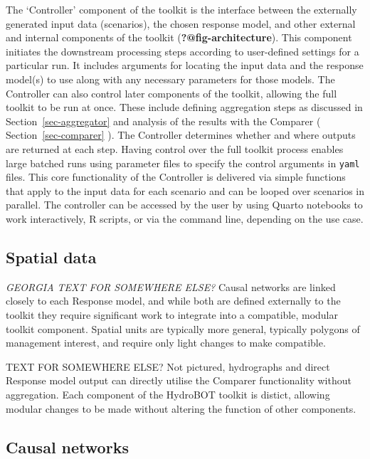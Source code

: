 \documentclass[
  number]{elsarticle}
\begin{document}
The `Controller' component of the toolkit is the interface between the
externally generated input data (scenarios), the chosen response model,
and other external and internal components of the toolkit
(\textbf{?@fig-architecture}). This component initiates the downstream
processing steps according to user-defined settings for a particular
run. It includes arguments for locating the input data and the response
model(s) to use along with any necessary parameters for those models.
The Controller can also control later components of the toolkit,
allowing the full toolkit to be run at once. These include defining
aggregation steps as discussed in Section~\ref{sec-aggregator} and
analysis of the results with the Comparer ( Section~\ref{sec-comparer}
). The Controller determines whether and where outputs are returned at
each step. Having control over the full toolkit process enables large
batched runs using parameter files to specify the control arguments in
\texttt{yaml} files. This core functionality of the Controller is
delivered via simple functions that apply to the input data for each
scenario and can be looped over scenarios in parallel. The controller
can be accessed by the user by using Quarto notebooks to work
interactively, R scripts, or via the command line, depending on the use
case.

\hypertarget{sec-spatial_data}{%
\subsection{Spatial data}\label{sec-spatial_data}}

\emph{GEORGIA TEXT FOR SOMEWHERE ELSE?} Causal networks are linked
closely to each Response model, and while both are defined externally to
the toolkit they require significant work to integrate into a
compatible, modular toolkit component. Spatial units are typically more
general, typically polygons of management interest, and require only
light changes to make compatible.

TEXT FOR SOMEWHERE ELSE? Not pictured, hydrographs and direct Response
model output can directly utilise the Comparer functionality without
aggregation. Each component of the HydroBOT toolkit is distict, allowing
modular changes to be made without altering the function of other
components.

\hypertarget{sec-causal_networks}{%
\subsection{Causal networks}\label{sec-causal_networks}}
\end{document}
